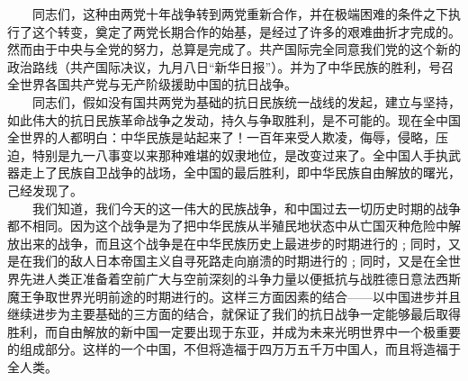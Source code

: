 \documentclass[cn,11pt,chinese]{elegantbook}
\begin{document}
　　同志们，这种由两党十年战争转到两党重新合作，并在极端困难的条件之下执行了这个转变，奠定了两党长期合作的始基，是经过了许多的艰难曲折才完成的。然而由于中央与全党的努力，总算是完成了。共产国际完全同意我们党的这个新的政治路线（共产国际决议，九月八日“新华日报”）。并为了中华民族的胜利，号召全世界各国共产党与无产阶级援助中国的抗日战争。\\
　　同志们，假如没有国共两党为基础的抗日民族统一战线的发起，建立与坚持，如此伟大的抗日民族革命战争之发动，持久与争取胜利，是不可能的。现在全中国全世界的人都明白：中华民族是站起来了！一百年来受人欺凌，侮辱，侵略，压迫，特别是九一八事变以来那种难堪的奴隶地位，是改变过来了。全中国人手执武器走上了民族自卫战争的战场，全中国的最后胜利，即中华民族自由解放的曙光，己经发现了。\\
　　我们知道，我们今天的这一伟大的民族战争，和中国过去一切历史时期的战争都不相同。因为这个战争是为了把中华民族从半殖民地状态中从亡国灭种危险中解放出来的战争，而且这个战争是在中华民族历史上最进步的时期进行的﹔同时，又是在我们的敌人日本帝国主义自寻死路走向崩溃的时期进行的﹔同时，又是在全世界先进人类正准备着空前广大与空前深刻的斗争力量以便抵抗与战胜德日意法西斯魔王争取世界光明前途的时期进行的。这样三方面因素的结合——以中国进步并且继续进步为主要基础的三方面的结合，就保证了我们的抗日战争一定能够最后取得胜利，而自由解放的新中国一定要出现于东亚，并成为未来光明世界中一个极重要的组成部分。这样的一个中国，不但将造福于四万万五千万中国人，而且将造福于全人类。\\
\end{document}
